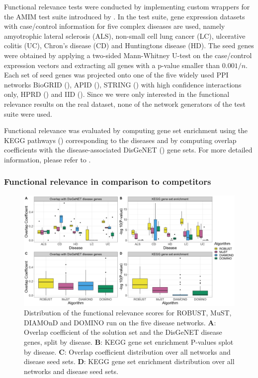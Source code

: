 \documentclass{bioinfo}
\begin{document}
Functional relevance tests were conducted by implementing custom wrappers for the AMIM test suite introduced by \cite{amim_lazareva2021}. In the test suite, gene expression datasets with case/control information for five complex diseases are used, namely amyotrophic lateral sclerosis (ALS), non-small cell lung cancer (LC), ulcerative colitis (UC), Chron's disease (CD) and Huntingtons disease (HD). The seed genes were obtained by applying a two-sided Mann-Whitney U-test on the case/control expression vectors and extracting all genes with a p-value smaller than $0.001/n$. Each set of seed genes was projected onto one of the five widely used PPI networks BioGRID (\cite{biogrid_oughtred2019}), APID (\cite{apid_alonso2016,apid_alonso2019}), STRING (\cite{string_szklarczyk2019}) with high confidence interactions only, HPRD (\cite{hprd_keshava2009}) and IID (\cite{iid_kotlyar2019}). Since we were only interested in the functional relevance results on the real dataset, none of the network generators of the test suite were used. 

Functional relevance was evaluated by computing gene set enrichment using the KEGG pathways (\cite{kegg_kanehisa2016}) corresponding to the diseases and by computing overlap coefficients with the disease-associated DisGeNET (\cite{disgenet_pinero2020}) gene sets. For more detailed information, please refer to \cite{amim_lazareva2021}.

\subsubsection{Functional relevance in comparison to competitors}

\begin{figure}[htb]
\centering
\includegraphics[width=0.95\linewidth]{img/functional_relevance_all.png}
\caption[Distribution of the functional relevance scores.]{Distribution of the functional relevance scores for ROBUST, MuST, DIAMOnD and DOMINO run on the five disease networks. \textbf{A}: Overlap coefficient of the solution set and the DisGeNET disease genes, split by disease. \textbf{B}: KEGG gene set enrichment P-values splot by disease. \textbf{C}: Overlap coefficient distribution over all networks and disease seed sets. \textbf{D}: KEGG gene set enrichment distribution over all networks and disease seed sets.}
\label{functional_relevance}
\end{figure}
\end{document}
